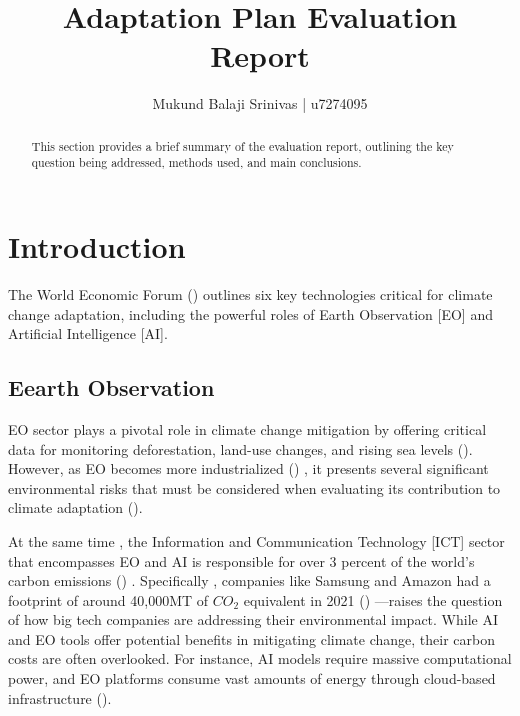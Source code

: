 \documentclass[12pt]{article}
\title{Adaptation Plan Evaluation Report}
\author{Mukund Balaji Srinivas | u7274095}
\date{} %
\begin{document}
\maketitle

\begin{abstract}
This section provides a brief summary of the evaluation report, outlining the key question being addressed, methods used, and main conclusions.
\end{abstract}

\newpage

\section*{Introduction}

The World Economic Forum (\cite{masterson_2024})  outlines six key technologies critical for climate change adaptation, 
including the powerful roles of Earth Observation [EO] and Artificial Intelligence [AI]. 


\subsection*{Eearth Observation}
EO sector plays a pivotal role in climate change mitigation by offering critical data for monitoring deforestation, land-use changes, and rising sea levels (\cite{anderson_2017}). 
However, as EO becomes more industrialized (\cite{venkatesan_2020}) , it presents several significant environmental risks that must be considered when evaluating its contribution to climate adaptation (\cite{crisp_2020}).

At the same time , the  Information and Communication Technology [ICT] sector that encompasses EO and AI
is responsible for over 3 percent of the world's carbon emissions (\cite{jones_2018}) . Specifically , 
companies like Samsung and Amazon had a footprint of around 40,000MT of \(CO_2\) equivalent in 2021 (\cite{navarro_2023_the}) —raises the question 
of how big tech companies are addressing their environmental impact. While AI and EO tools offer potential benefits in 
mitigating climate change, their carbon costs are often overlooked. For instance, AI models require massive computational power, 
and EO platforms consume vast amounts of energy through cloud-based infrastructure (\cite{taddeo_2021}).
\end{document}
